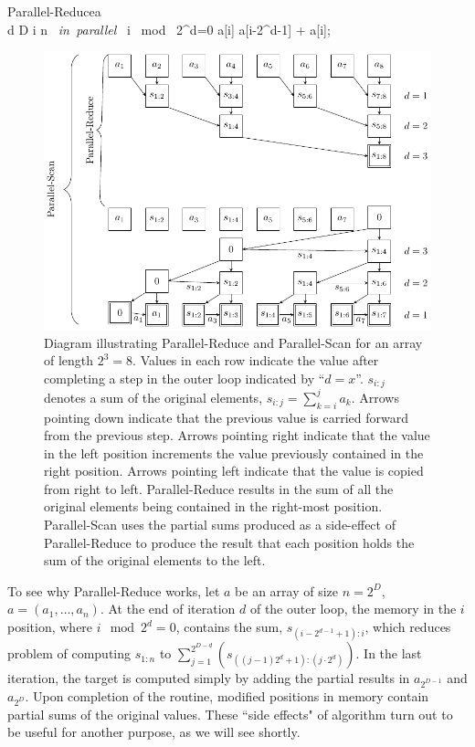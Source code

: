 {\begin{pseudocode}[ruled]{Parallel-Reduce}{a}
\label{reduce}
\\
\FOR d  \TO D \DO \BEGIN
  \FOR i  \TO n \mbox{ \em in parallel }\DO \BEGIN
    \IF i \mbox{ mod } 2^d=0 \DO \BEGIN
    a[i] \GETS a[i-2^{d-1}] + a[i];\\
    \END \END \END
\end{pseudocode}

\begin{figure}
\includegraphics[width=\textwidth]{diagram}
\caption{\small Diagram illustrating Parallel-Reduce and Parallel-Scan for an array of length $2^3=8$. Values in each row indicate the value after completing a step in the outer loop indicated by ``$d=x$''. $s_{i:j}$ denotes a sum of the original elements, $s_{i:j}=\sum_{k=i}^j a_k$. Arrows pointing down indicate that the previous value is carried forward from the previous step. Arrows pointing right indicate that the value in the left position increments the value previously contained in the right position. Arrows pointing left indicate that the value is copied from right to left. Parallel-Reduce results in the sum of all the original elements being contained in the right-most position. Parallel-Scan uses the partial sums produced as a side-effect of Parallel-Reduce to produce the result that each position holds the sum of the original elements to the left.}
\label{scan-illustration}
\end{figure}

To see why Parallel-Reduce works, let $a$ be an array of size $n=2^D$, $a=(a_1,\ldots,a_n)$. At the end of iteration $d$ of the outer loop, the memory in the $i$ position, where $i \mod 2^d =0$, contains the sum, $s_{(i-2^{d-1}+1):i}$, which reduces problem of computing $s_{1:n}$ to $\sum_{j=1}^{2^{D-d}}(s_{((j-1) 2^d+1):(j\cdot 2^d)})$. In the last iteration, the target is computed simply by adding the partial results in $a_{2^{D-1}}$ and $a_{2^{D}}$. Upon completion of the routine, modified positions in memory contain partial sums of the original values. These ``side effects" of algorithm turn out to be useful for another purpose, as we will see shortly. 

}
